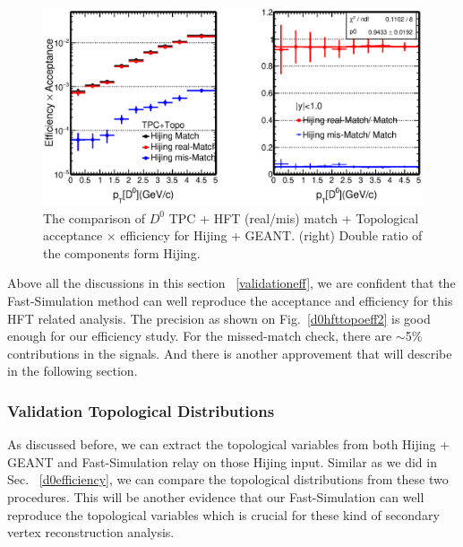 \begin{figure}[htbp]
\centering
\includegraphics[keepaspectratio,width=1.0\textwidth,angle=0]{figure/Run14_D0HFT/ALL_Physics_FastHijingVsPureHijing_HFTTopo.eps}
\caption{The comparison of $D^0$ TPC + HFT (real/mis) match + Topological acceptance $\times$ efficiency for Hijing + GEANT. (right) Double ratio of the components form Hijing.}
\label{d0hfttopoAlleff}
\end{figure}

Above all the discussions in this section ~\ref{validationeff}, we are confident that the Fast-Simulation method can well reproduce the acceptance and efficiency for this HFT related analysis. The precision as shown on Fig.~\ref{d0hfttopoeff2} is good enough for our efficiency study. For the missed-match check, there are $\sim$5\% contributions in the signals. And there is another approvement that will describe in the following section.

\subsubsection{Validation Topological Distributions}
\label{validationTopo}

As discussed before, we can extract the topological variables from both Hijing + GEANT and Fast-Simulation relay on those Hijing input. Similar as we did in Sec. ~\ref{d0efficiency}, we can compare the topological distributions from these two procedures. This will be another evidence that our Fast-Simulation can well reproduce the topological variables which is crucial for these kind of secondary vertex reconstruction analysis.

